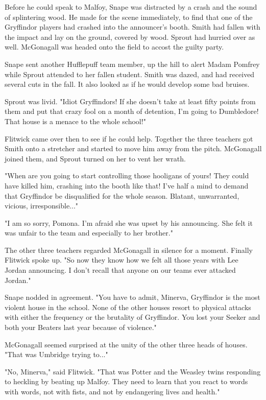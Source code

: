 \documentclass[a4paper,11pt]{article}
\begin{document}
Before he could speak to Malfoy, Snape was distracted by a crash and the sound of splintering wood. He made for the scene immediately, to find that one of the Gryffindor players had crashed into the announcer's booth. Smith had fallen with the impact and lay on the ground, covered by wood. Sprout had hurried over as well. McGonagall was headed onto the field to accost the guilty party.

Snape sent another Hufflepuff team member, up the hill to alert Madam Pomfrey while Sprout attended to her fallen student. Smith was dazed, and had received several cuts in the fall. It also looked as if he would develop some bad bruises.

Sprout was livid. "Idiot Gryffindors! If she doesn't take at least fifty points from them and put that crazy fool on a month of detention, I'm going to Dumbledore! That house is a menace to the whole school!"

Flitwick came over then to see if he could help. Together the three teachers got Smith onto a stretcher and started to move him away from the pitch. McGonagall joined them, and Sprout turned on her to vent her wrath.

"When are you going to start controlling those hooligans of yours! They could have killed him, crashing into the booth like that! I've half a mind to demand that Gryffindor be disqualified for the whole season. Blatant, unwarranted, vicious, irresponsible..."

"I am so sorry, Pomona. I'm afraid she was upset by his announcing. She felt it was unfair to the team and especially to her brother."

The other three teachers regarded McGonagall in silence for a moment. Finally Flitwick spoke up. "So now they know how we felt all those years with Lee Jordan announcing. I don't recall that anyone on our teams ever attacked Jordan."

Snape nodded in agreement. "You have to admit, Minerva, Gryffindor is the most violent house in the school. None of the other houses resort to physical attacks with either the frequency or the brutality of Gryffindor. You lost your Seeker and both your Beaters last year because of violence."

McGonagall seemed surprised at the unity of the other three heads of houses. "That was Umbridge trying to..."

"No, Minerva," said Flitwick. "That was Potter and the Weasley twins responding to heckling by beating up Malfoy. They need to learn that you react to words with words, not with fists, and not by endangering lives and health."
\end{document}
